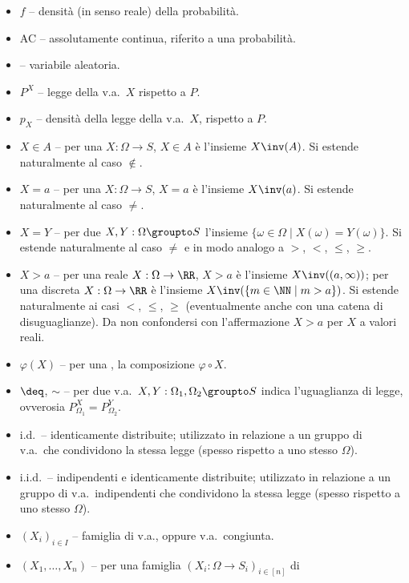 \begin{multicols*}{2}
\begin{itemize}
        \item $f$ -- densità (in senso reale) della probabilità.
        \item AC -- assolutamente continua, riferito a una probabilità.
        \item \va -- variabile aleatoria.
        \item $P^X$ -- legge della v.a.~$X$ rispetto a $P$.
        \item $p_X$ -- densità della legge della v.a.~$X$, rispetto a $P$.
        \item $X \in A$ -- per una \va $X : \Omega \to S$,
        $X \in A$ è l'insieme $X\inv(A)$. Si estende naturalmente
        al caso $\notin$.
        \item $X = a$ -- per una \va $X : \Omega \to S$,
        $X = a$ è l'insieme $X\inv(a)$. Si estende naturalmente
        al caso $\neq$.
        \item $X = Y$ -- per due \va $X, Y : \Omega \groupto S$
        l'insieme $\{ \omega \in \Omega \mid X(\omega) = Y(\omega) \}$.
        Si estende naturalmente al caso $\neq$ e in modo analogo a $>$, $<$, $\leq$, $\geq$.
        \item $X > a$ -- per una \va reale $X : \Omega \to \RR$,
        $X > a$ è l'insieme $X\inv((a, \infty))$; per una \va discreta
        $X : \Omega \to \RR$ è l'insieme $X\inv(\{m \in \NN \mid m > a\})$.
        Si estende naturalmente ai casi $<$, $\leq$, $\geq$ (eventualmente
        anche con una catena di disuguaglianze). Da non confondersi con
        l'affermazione $X > a$ per $X$ a valori reali.
        \item $\varphi(X)$ -- per una \va, la composizione $\varphi \circ X$.
        \item $\deq$, $\sim$ -- per due v.a.~$X, Y : \Omega_1, \Omega_2 \groupto S$
        indica l'uguaglianza di legge, ovverosia $P_{\Omega_1}^X = P_{\Omega_2}^Y$.
        \item i.d.~-- identicamente distribuite; utilizzato in relazione a un gruppo
        di v.a.~che condividono la stessa legge (spesso rispetto a uno stesso $\Omega$).
        \item i.i.d.~-- indipendenti e identicamente distribuite; utilizzato in relazione
        a un gruppo di v.a.~indipendenti che condividono la stessa legge (spesso rispetto
        a uno stesso $\Omega$).
        \item $(X_i)_{i \in I}$ -- famiglia di v.a., oppure v.a.~congiunta.
        \item $(X_1, \ldots, X_n)$ -- per una famiglia $(X_i : \Omega \to S_i)_{i \in [n]}$ di

\end{itemize}
\end{multicols*}
